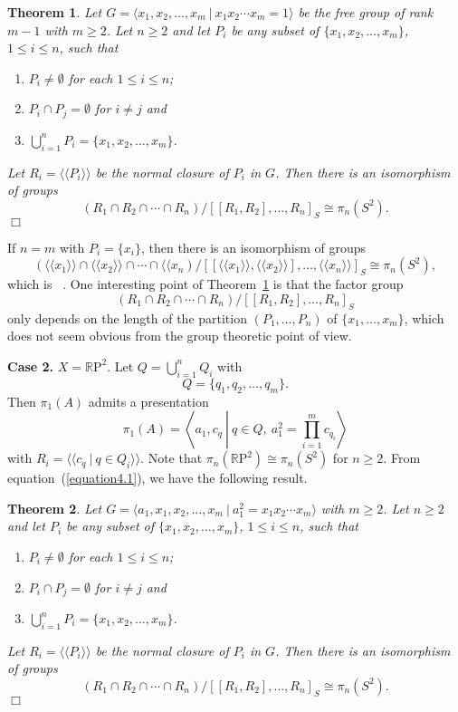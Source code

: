 \documentclass[10pt]{amsart}
\newtheorem{thm}{Theorem}[section]
\let\la=\langle
\let\ra=\rangle
\numberwithin{equation}{section}
\begin{document}
\begin{thm}\label{theorem4.1}
Let $G=\la x_1,x_2,\ldots,x_m \ | \ x_1x_2\cdots x_m=1\ra$ be the free group of rank $m-1$ with $m\geq2$. Let $n\geq 2$ and let $P_i$ be any subset of $\{x_1,x_2,\ldots,x_m\}$, $1\leq i\leq n$, such that
\begin{enumerate}
\item[(i)] $P_i\not=\emptyset$ for each $1\leq i\leq n$;
\item[(ii)] $P_i\cap P_j=\emptyset$ for $i\not=j$ and
\item[(iii)] $\bigcup_{i=1}^n P_i=\{x_1,x_2,\ldots,x_m\}$.
\end{enumerate}
Let $R_i=\la\la P_i\ra\ra$ be the normal closure of $P_i$ in $G$. Then there is an isomorphism of groups
$$
(R_1\cap R_2\cap \cdots\cap R_n)/[[R_1,R_2],\ldots,R_n]_S\cong\pi_n(S^2).
$$\hfill $\Box$
\end{thm}

If $n=m$ with $P_i=\{x_i\}$, then there is an isomorphism of groups
$$
(\la\la x_1\ra\ra\cap \la\la x_2\ra\ra\cap\cdots\cap \la\la x_n)/[[\la\la x_1\ra\ra,\la\la x_2\ra\ra], \ldots,\la\la x_n\ra\ra]_S\cong \pi_n(S^2),
$$
which is ~\cite[Theorem 1.7]{Wu1}. One interesting point of Theorem~\ref{theorem4.1} is that the factor group
$$
(R_1\cap R_2\cap\cdots \cap R_n)/[[R_1,R_2],\ldots,R_n]_S
$$
only depends on the length of the partition $(P_1,\ldots,P_n)$ of
$\{x_1,\ldots,x_m\}$, which does not seem obvious from the group
theoretic point of view.

\bigskip

\noindent\textbf{Case 2.} $X={\mathbb{R}\mathrm{P}}^2$. Let $Q=\bigcup_{i=1}^nQ_i$ with
$$
Q=\{q_1,q_2,\ldots,q_m\}.
$$
Then $\pi_1(A)$ admits a presentation
$$
\pi_1(A)=\left\la a_1, c_q \ \left| \ q\in Q,\ a_1^2=\prod_{i=1}^mc_{q_i}\right.\right\ra
$$
with $R_i=\la\la c_q \ | \ q\in Q_i\ra\ra$. Note that $\pi_n({\mathbb{R}\mathrm{P}}^2)\cong \pi_n(S^2)$ for $n\geq 2$. From equation~(\ref{equation4.1}), we have the following result.

\begin{thm}\label{theorem4.2}
Let $G=\la a_1, x_1,x_2,\ldots,x_m \ | \ a_1^2=x_1x_2\cdots x_m\ra$ with $m\geq 2$. Let $n\geq 2$ and let $P_i$ be any subset of $\{x_1,x_2,\ldots,x_m\}$, $1\leq i\leq n$, such that
\begin{enumerate}
\item[(i)] $P_i\not=\emptyset$ for each $1\leq i\leq n$;
\item[(ii)] $P_i\cap P_j=\emptyset$ for $i\not=j$ and
\item[(iii)] $\bigcup_{i=1}^n P_i=\{x_1,x_2,\ldots,x_m\}$.
\end{enumerate}
Let $R_i=\la\la P_i\ra\ra$ be the normal closure of $P_i$ in $G$. Then there is an isomorphism of groups
$$
(R_1\cap R_2\cap \cdots\cap R_n)/[[R_1,R_2],\ldots,R_n]_S\cong\pi_n(S^2).
$$\hfill $\Box$
\end{thm}
\end{document}
